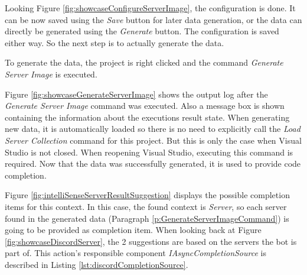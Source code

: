 Looking Figure \ref{fig:showcaseConfigureServerImage}, the configuration is done. It can be now saved using the \textit{Save} button for later data generation, or the data can directly be generated using the \textit{Generate} button. The configuration is saved either way. So the next step is to actually generate the data.

To generate the data, the project is right clicked and the command \textit{Generate Server Image} is executed.

Figure \ref{fig:showcaseGenerateServerImage} shows the output log after the \textit{Generate Server Image} command was executed. Also a message box is shown containing the information about the executions result state. When generating new data, it is automatically loaded so there is no need to explicitly call the \textit{Load Server Collection} command for this project. But this is only the case when Visual Studio is not closed. When reopening Visual Studio, executing this command is required. Now that the data was successfully generated, it is used to provide code completion.

Figure \ref{fig:intelliSenseServerResultSuggestion} displays the possible completion items for this context. In this case, the found context is \textit{Server}, so each server found in the generated data (Paragraph \ref{p:GenerateServerImageCommand}) is going to be provided as completion item. When looking back at Figure \ref{fig:showcaseDiscordServer}, the 2 suggestions are based on the servers the bot is part of. This action's responsible component \textit{IAsyncCompletionSource} is described in Listing \ref{lst:discordCompletionSource}.

